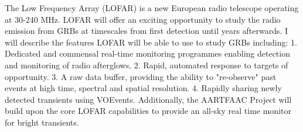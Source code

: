 


\bigskip



\bigskip

\noindent The Low Frequency Array (LOFAR) is a new European radio telescope operating at 30-240 MHz. LOFAR will offer an exciting opportunity to study the radio emission from GRBs at timescales from first detection until years afterwards. I will describe the features LOFAR will be able to use to study GRBs including:
1. Dedicated and commensal real-time monitoring programmes enabling detection and monitoring of radio afterglows.
2. Rapid, automated response to targets of opportunity.
3. A raw data buffer, providing the ability to "re-observe" past events at high time, spectral and spatial resolution.
4. Rapidly sharing newly detected transients using VOEvents.
Additionally, the AARTFAAC Project will build upon the core LOFAR capabilities to provide an all-sky real time monitor for bright transients.

